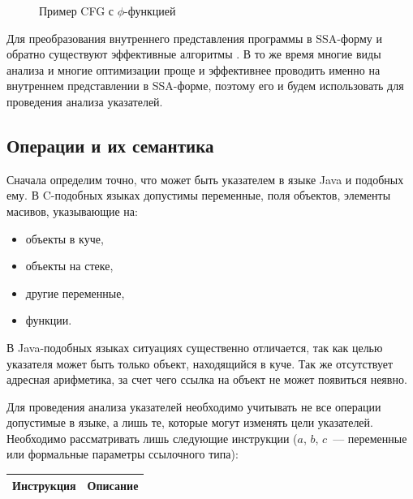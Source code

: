 \documentclass[14pt,titlepage]{extarticle}
\newenvironment{fresh}{\color{Blue}}{\color{black}}
\begin{document}
\begin{fresh}
      \begin{figure}[!htb]
        \caption{Пример CFG с $\phi$-функцией}
        \label{fig:cfg_with_phi}
      \end{figure}

      Для преобразования внутреннего представления программы в SSA-форму и
      обратно существуют эффективные алгоритмы \cite{ssa}. В то же время
      многие виды анализа и многие оптимизации проще и эффективнее проводить
      именно на внутреннем представлении в SSA-форме, поэтому его и будем
      использовать для проведения анализа указателей.

    \subsection{Операции и их семантика}

      Сначала определим точно, что может быть указателем в языке Java и
      подобных ему. В C-подобных языках допустимы переменные, поля объектов,
      элементы масивов, указывающие на:
      \begin{itemize}
        \item объекты в куче,
        \item объекты на стеке,
        \item другие переменные,
        \item функции.
      \end{itemize}
      В Java-подобных языках ситуациях существенно отличается, так как целью
      указателя может быть только объект, находящийся в куче. Так же
      отсутствует адресная арифметика, за счет чего ссылка на объект не может
      появиться неявно.

      Для проведения анализа указателей необходимо учитывать не все операции
      допустимые в языке, а лишь те, которые могут изменять цели указателей.
      Необходимо рассматривать лишь следующие инструкции ($a$, $b$, $c$~---
      переменные или формальные параметры ссылочного типа):
      \begin{center}
        \begin{tabular}{|l|p{120mm}|}\hline
          \textbf{Инструкция} & \textbf{Описание}\\ \hline


\end{tabular}
\end{center}
\end{fresh}
\end{document}
